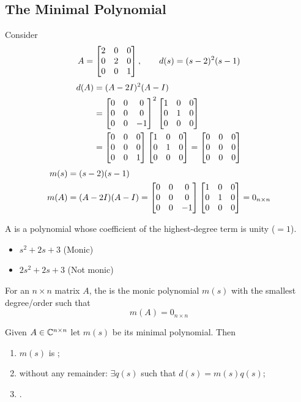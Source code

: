 \subsection{The Minimal Polynomial}\label{ss:minpoly}
Consider
\[
A=\begin{bmatrix}2&0&0\\0&2&0\\0&0&1\end{bmatrix},\qquad d(s)=(s-2)^2(s-1)
\]
\begin{align*}
d(A)&=(A-2I)^2(A-I)\\
&=\begin{bmatrix}0&0&0\\0&0&0\\0&0&-1\end{bmatrix}^2\begin{bmatrix}1&0&0\\0&1&0\\0&0&0\end{bmatrix}\\
&=\begin{bmatrix}0&0&0\\0&0&0\\0&0&1\end{bmatrix}\begin{bmatrix}1&0&0\\0&1&0\\0&0&0\end{bmatrix}=\begin{bmatrix}0&0&0\\0&0&0\\0&0&0\end{bmatrix}
\end{align*}
\begin{align*}
m(s)&=(s-2)(s-1)\\
m(A)&=(A-2I)(A-I)=\begin{bmatrix}0&0&0\\0&0&0\\0&0&-1\end{bmatrix}\begin{bmatrix}1&0&0\\0&1&0\\0&0&0\end{bmatrix}=0_{n\times n}
\end{align*}

\begin{definition}
A  is a polynomial whose coefficient of the highest-degree term is unity ($=1$).
\begin{itemize}
\item $s^2+2s+3$ \quad (Monic)
\item $2s^2+2s+3$ \quad (Not monic)
\end{itemize}
\end{definition}
\begin{definition}
For an $n\times n$ matrix $A$, the  is the monic polynomial $m(s)$ with the smallest degree/order such that
\[ m(A)=0_{n\times n} \]
\end{definition}
\begin{theorem}
Given $A\in\mathbb{C}^{n\times n}$ let $m(s)$ be its minimal polynomial. Then
\begin{enumerate}[label=\Roman*)]
\item $m(s)$ is ;
\item {} without any remainder: $\exists q(s)$ such that $d(s)=m(s)q(s)$;
\item {}.
\end{enumerate}
\end{theorem}

